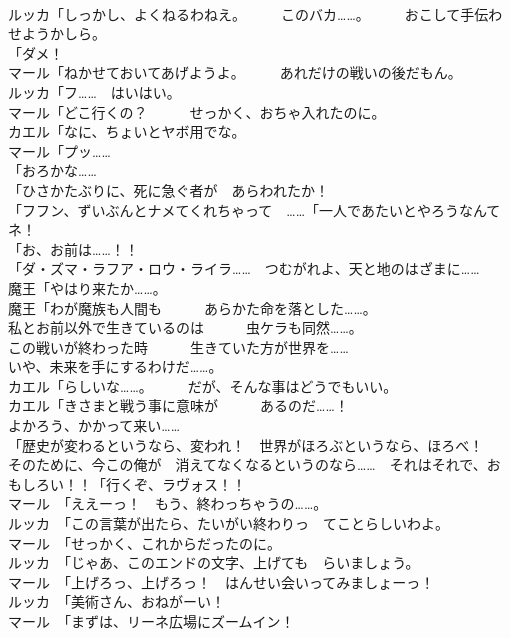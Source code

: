 \documentclass[8pt]{extreport}
\begin{document}
\begin{CJK}{UTF8}{min}
\\	ルッカ「しっかし、よくねるわねえ。　　　このバカ……。　　　おこして手伝わせようかしら。	
\\	「ダメ！	
\\	マール「ねかせておいてあげようよ。　　　あれだけの戦いの後だもん。	
\\	ルッカ「フ……　はいはい。	
\\	マール「どこ行くの？　　　せっかく、おちゃ入れたのに。	
\\	カエル「なに、ちょいとヤボ用でな。	
\\	マール「プッ……	
\\	「おろかな……	
\\	「ひさかたぶりに、死に急ぐ者が　あらわれたか！	
\\	「フフン、ずいぶんとナメてくれちゃって　……「一人であたいとやろうなんてネ！	
\\	「お、お前は……！！	
\\	「ダ・ズマ・ラフア・ロウ・ライラ……　つむがれよ、天と地のはざまに……	
\\	魔王「やはり来たか……。	
\\	魔王「わが魔族も人間も　　　あらかた命を落とした……。	
\\	私とお前以外で生きているのは　　　虫ケラも同然……。	
\\	この戦いが終わった時　　　生きていた方が世界を……	
\\	いや、未来を手にするわけだ……。	
\\	カエル「らしいな……。　　　だが、そんな事はどうでもいい。	
\\	カエル「きさまと戦う事に意味が　　　あるのだ……！	
\\	よかろう、かかって来い……	
\\	「歴史が変わるというなら、変われ！　世界がほろぶというなら、ほろべ！	
\\	そのために、今この俺が　消えてなくなるというのなら……　それはそれで、おもしろい！！「行くぞ、ラヴォス！！	
\\	マール　「ええーっ！　もう、終わっちゃうの……。	
\\	ルッカ　「この言葉が出たら、たいがい終わりっ　てことらしいわよ。	
\\	マール　「せっかく、これからだったのに。	
\\	ルッカ　「じゃあ、このエンドの文字、上げても　らいましょう。	
\\	マール　「上げろっ、上げろっ！　はんせい会いってみましょーっ！	
\\	ルッカ　「美術さん、おねがーい！	
\\	マール　「まずは、リーネ広場にズームイン！	

\end{CJK}
\end{document}
